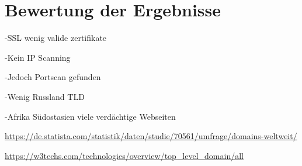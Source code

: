 
\section{Bewertung der Ergebnisse}

-SSL wenig valide zertifikate

-Kein IP Scanning

-Jedoch Portscan gefunden

-Wenig Russland TLD

-Afrika Südostasien viele verdächtige Webseiten

\url{https://de.statista.com/statistik/daten/studie/70561/umfrage/domains-weltweit/}

\url{https://w3techs.com/technologies/overview/top_level_domain/all}